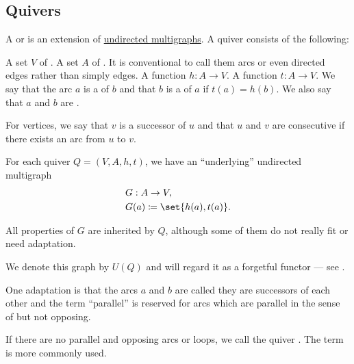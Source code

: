 \subsection{Quivers}\label{subsec:quivers}

\begin{definition}\label{def:graph}
  A  or  is an extension of \hyperref[def:undirected_multigraph]{undirected multigraphs}. A quiver consists of the following:
  \begin{thmenum}
     A set \( V \) of .
     A set \( A \) of . It is conventional to call them arcs or even directed edges rather than simply edges.
     A  function \( h: A \to V \).
     A  function \( t: A \to V \).
     We say that the arc \( a \) is a  of \( b \) and that \( b \) is a  of \( a \) if \( t(a) = h(b) \). We also say that \( a \) and \( b \) are .

    For vertices, we say that \( v \) is a successor of \( u \) and that \( u \) and \( v \) are consecutive if there exists an arc from \( u \) to \( v \).

     For each quiver \( Q = (V, A, h, t) \), we have an \enquote{underlying} undirected multigraph
    \begin{equation}\label{eq:def:quiver/forgetful}
      \begin{aligned}
        &G: A \to V, \\
        &G(a) \coloneqq \set{ h(a), t(a) }.
      \end{aligned}
    \end{equation}

    All properties of \( G \) are inherited by \( Q \), although some of them do not really fit or need adaptation.

    We denote this graph by \( U(Q) \) and will regard it as a forgetful functor --- see .

     One adaptation is that the arcs \( a \) and \( b \) are called  they are successors of each other and the term \enquote{parallel} is reserved for arcs which are parallel in the sense of  but not opposing.

     If there are no parallel and opposing arcs or loops, we call the quiver . The term  is more commonly used.


\end{thmenum}
\end{definition}
